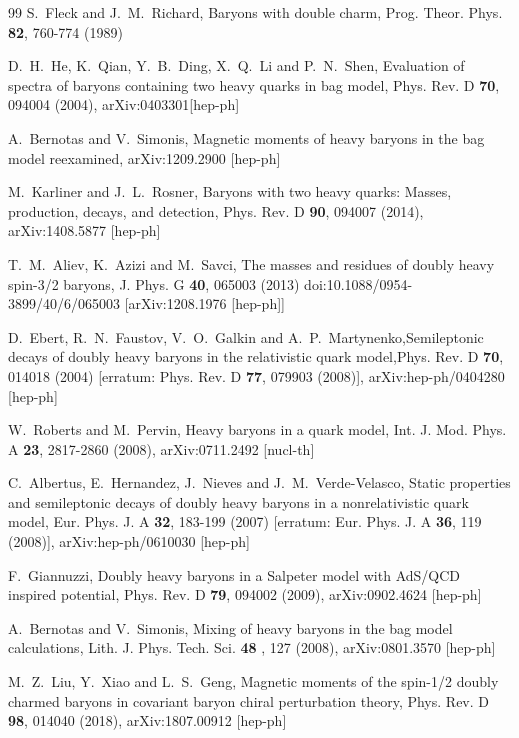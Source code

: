 \documentclass[12pt,prd,onecolumn,floatfix,nofootinbib]{revtex4}
\begin{document}
\begin{thebibliography}{99}
 S.~Fleck and J.~M.~Richard, Baryons with double
charm, Prog. Theor. Phys. \textbf{82}, 760-774 (1989)

 D.~H.~He, K.~Qian, Y.~B.~Ding, X.~Q.~Li and P.~N.~Shen,
Evaluation of spectra of baryons containing two heavy quarks in bag model,
Phys. Rev. D \textbf{70}, 094004 (2004), arXiv:0403301[hep-ph]

 A.~Bernotas and V.~Simonis, Magnetic moments of
heavy baryons in the bag model reexamined, arXiv:1209.2900 [hep-ph]

 M.~Karliner and J.~L.~Rosner, Baryons with two heavy
quarks: Masses, production, decays, and detection, Phys. Rev. D \textbf{90},
094007 (2014), arXiv:1408.5877 [hep-ph]

 T.~M.~Aliev, K.~Azizi and M.~Savci,
The masses and residues of doubly heavy spin-3/2 baryons,
J. Phys. G \textbf{40}, 065003 (2013)
doi:10.1088/0954-3899/40/6/065003 [arXiv:1208.1976 [hep-ph]]

 D.~Ebert, R.~N.~Faustov, V.~O.~Galkin and
A.~P.~Martynenko,Semileptonic decays of doubly heavy baryons in the
relativistic quark model,Phys. Rev. D \textbf{70}, 014018 (2004) [erratum:
Phys. Rev. D \textbf{77}, 079903 (2008)], arXiv:hep-ph/0404280 [hep-ph]

 W.~Roberts and M.~Pervin, Heavy baryons in a quark
model, Int. J. Mod. Phys. A \textbf{23}, 2817-2860 (2008), arXiv:0711.2492
[nucl-th]

 C.~Albertus, E.~Hernandez, J.~Nieves and
J.~M.~Verde-Velasco, Static properties and semileptonic decays of doubly
heavy baryons in a nonrelativistic quark model, Eur. Phys. J. A \textbf{32},
183-199 (2007) [erratum: Eur. Phys. J. A \textbf{36}, 119 (2008)],
arXiv:hep-ph/0610030 [hep-ph]

 F.~Giannuzzi, Doubly heavy baryons in a Salpeter
model with AdS/QCD inspired potential, Phys. Rev. D \textbf{79}, 094002
(2009), arXiv:0902.4624 [hep-ph]

 A.~Bernotas and V.~Simonis, Mixing of heavy
baryons in the bag model calculations, Lith. J. Phys. Tech. Sci. \textbf{48}%
, 127 (2008), arXiv:0801.3570 [hep-ph]

 M.~Z.~Liu, Y.~Xiao and L.~S.~Geng, Magnetic moments of
the spin-1/2 doubly charmed baryons in covariant baryon chiral perturbation
theory, Phys. Rev. D \textbf{98}, 014040 (2018), arXiv:1807.00912 [hep-ph]


\end{thebibliography}
\end{document}
